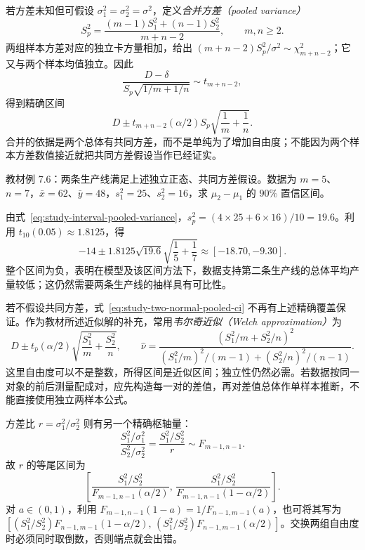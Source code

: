若方差未知但可假设 $\sigma_1^2=\sigma_2^2=\sigma^2$，定义\emph{合并方差（pooled variance）}
\begin{equation}
  S_p^2=\frac{(m-1)S_1^2+(n-1)S_2^2}{m+n-2},
  \qquad m,n\ge2.
  \label{eq:study-interval-pooled-variance}
\end{equation}
两组样本方差对应的独立卡方量相加，给出 $(m+n-2)S_p^2/\sigma^2\sim\chi_{m+n-2}^2$；它又与两个样本均值独立。因此
\[
  \frac{D-\delta}{S_p\sqrt{1/m+1/n}}\sim t_{m+n-2},
\]
得到精确区间
\begin{equation}
  D\pm t_{m+n-2}(\alpha/2)S_p\sqrt{\frac1m+\frac1n}.
  \label{eq:study-two-normal-pooled-ci}
\end{equation}
合并的依据是两个总体有共同方差，而不是单纯为了增加自由度；不能因为两个样本方差数值接近就把共同方差假设当作已经证实。

\begin{example}
\label{ex:study-two-production-lines}
教材例 7.6：两条生产线满足上述独立正态、共同方差假设。数据为 $m=5$、$n=7$，$\bar x=62$、$\bar y=48$，$s_1^2=25$、$s_2^2=16$，求 $\mu_2-\mu_1$ 的 $90\%$ 置信区间。
\end{example}
\begin{solve}
由式~\eqref{eq:study-interval-pooled-variance}，$s_p^2=(4\times25+6\times16)/10=19.6$。利用 $t_{10}(0.05)\approx1.8125$，得
\[
  -14\pm1.8125\sqrt{19.6}\sqrt{\frac15+\frac17}
  \approx[-18.70,-9.30].
\]
整个区间为负，表明在模型及该区间方法下，数据支持第二条生产线的总体平均产量较低；这仍然需要两条生产线的抽样具有可比性。
\end{solve}

若不假设共同方差，式~\eqref{eq:study-two-normal-pooled-ci} 不再有上述精确覆盖保证。作为教材所述近似解的补充，常用\emph{韦尔奇近似（Welch approximation）}为
\begin{equation}
  D\pm t_{\widehat\nu}(\alpha/2)
             \sqrt{\frac{S_1^2}{m}+\frac{S_2^2}{n}},\qquad
  \widehat\nu=
  \frac{(S_1^2/m+S_2^2/n)^2}
       {(S_1^2/m)^2/(m-1)+(S_2^2/n)^2/(n-1)}.
  \label{eq:study-welch-ci}
\end{equation}
这里自由度可以不是整数，所得区间是近似区间；独立性仍然必需。若数据按同一对象的前后测量配成对，应先构造每一对的差值，再对差值总体作单样本推断，不能直接使用独立两样本公式。

方差比 $r=\sigma_1^2/\sigma_2^2$ 则有另一个精确枢轴量：
\[
  \frac{S_1^2/\sigma_1^2}{S_2^2/\sigma_2^2}
   =\frac{S_1^2/S_2^2}{r}\sim F_{m-1,n-1}.
\]
故 $r$ 的等尾区间为
\begin{equation}
  \left[
    \frac{S_1^2/S_2^2}{F_{m-1,n-1}(\alpha/2)},\,
    \frac{S_1^2/S_2^2}{F_{m-1,n-1}(1-\alpha/2)}
  \right].
  \label{eq:study-normal-variance-ratio-ci}
\end{equation}
对 $a\in(0,1)$，利用 $F_{m-1,n-1}(1-a)=1/F_{n-1,m-1}(a)$，也可将其写为
$[(S_1^2/S_2^2)F_{n-1,m-1}(1-\alpha/2),\,(S_1^2/S_2^2)F_{n-1,m-1}(\alpha/2)]$。交换两组自由度时必须同时取倒数，否则端点就会出错。

